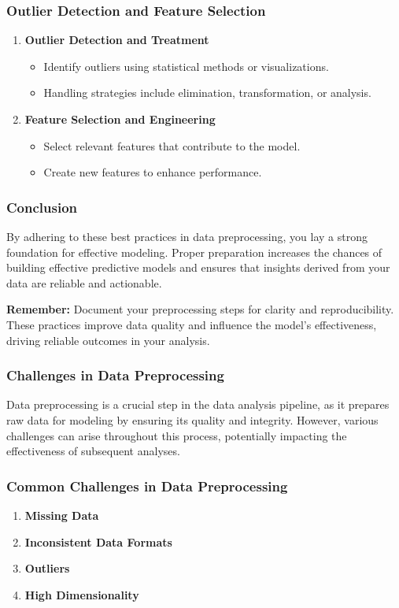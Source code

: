\documentclass[aspectratio=169]{beamer}
\begin{document}
\begin{frame}[fragile]
    \frametitle{Outlier Detection and Feature Selection}
    \begin{enumerate}
        \item \textbf{Outlier Detection and Treatment}
        \begin{itemize}
            \item Identify outliers using statistical methods or visualizations.
            \item Handling strategies include elimination, transformation, or analysis.
        \end{itemize}

        \item \textbf{Feature Selection and Engineering}
        \begin{itemize}
            \item Select relevant features that contribute to the model.
            \item Create new features to enhance performance.
        \end{itemize}
    \end{enumerate}
\end{frame}

\begin{frame}[fragile]
    \frametitle{Conclusion}
    By adhering to these best practices in data preprocessing, you lay a strong foundation for effective modeling. 
    Proper preparation increases the chances of building effective predictive models and ensures that insights derived from your data are reliable and actionable.

    \textbf{Remember:} Document your preprocessing steps for clarity and reproducibility. 
    These practices improve data quality and influence the model’s effectiveness, driving reliable outcomes in your analysis.
\end{frame}

\begin{frame}[fragile]
    \frametitle{Challenges in Data Preprocessing}
    Data preprocessing is a crucial step in the data analysis pipeline, as it prepares raw data for modeling by ensuring its quality and integrity. However, various challenges can arise throughout this process, potentially impacting the effectiveness of subsequent analyses.
\end{frame}

\begin{frame}[fragile]
    \frametitle{Common Challenges in Data Preprocessing}
    \begin{enumerate}
        \item \textbf{Missing Data}
        \item \textbf{Inconsistent Data Formats}
        \item \textbf{Outliers}
        \item \textbf{High Dimensionality}
    \end{enumerate}
\end{frame}
\end{document}
